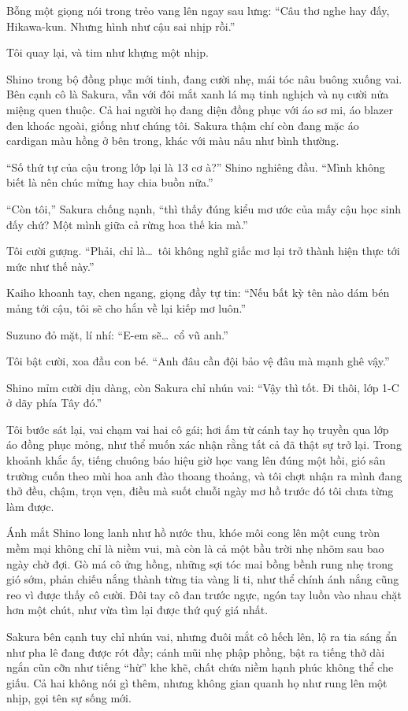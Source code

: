 \documentclass[../main.tex]{subfiles}
\begin{document}
Bỗng một giọng nói trong trẻo vang lên ngay sau lưng: ``Câu thơ nghe hay đấy, Hikawa-kun. Nhưng hình như cậu sai nhịp rồi.''

Tôi quay lại, và tim như khựng một nhịp.

Shino trong bộ đồng phục mới tinh, đang cười nhẹ, mái tóc nâu buông xuống vai. Bên cạnh cô là Sakura, vẫn với đôi mắt xanh lá mạ tinh nghịch và nụ cười nửa miệng quen thuộc. Cả hai người họ đang diện đồng phục với áo sơ mi, áo blazer đen khoác ngoài, giống như chúng tôi. Sakura thậm chí còn đang mặc áo cardigan màu hồng ở bên trong, khác với màu nâu như bình thường.

``Số thứ tự của cậu trong lớp lại là 13 cơ à?'' Shino nghiêng đầu. ``Mình không biết là nên chúc mừng hay chia buồn nữa.''

``Còn tôi,'' Sakura chống nạnh, ``thì thấy đúng kiểu mơ ước của mấy cậu học sinh đấy chứ? Một mình giữa cả rừng hoa thế kia mà.''

Tôi cười gượng. ``Phải, chỉ là\dots\ tôi không nghĩ giấc mơ lại trở thành hiện thực tới mức như thế này.''

Kaiho khoanh tay, chen ngang, giọng đầy tự tin: ``Nếu bất kỳ tên nào dám bén mảng tới cậu, tôi sẽ cho hắn về lại kiếp mơ luôn.''

Suzuno đỏ mặt, lí nhí: ``E-em sẽ\dots\ cổ vũ anh.''

Tôi bật cười, xoa đầu con bé. ``Anh đâu cần đội bảo vệ đâu mà mạnh ghê vậy.''

Shino mỉm cười dịu dàng, còn Sakura chỉ nhún vai: ``Vậy thì tốt. Đi thôi, lớp 1-C ở dãy phía Tây đó.''

Tôi bước sát lại, vai chạm vai hai cô gái; hơi ấm từ cánh tay họ truyền qua lớp áo đồng phục mỏng, như thể muốn xác nhận rằng tất cả đã thật sự trở lại. Trong khoảnh khắc ấy, tiếng chuông báo hiệu giờ học vang lên đúng một hồi, gió sân trường cuốn theo mùi hoa anh đào thoang thoảng, và tôi chợt nhận ra mình đang thở đều, chậm, trọn vẹn, điều mà suốt chuỗi ngày mơ hồ trước đó tôi chưa từng làm được.

Ánh mắt Shino long lanh như hồ nước thu, khóe môi cong lên một cung tròn mềm mại không chỉ là niềm vui, mà còn là cả một bầu trời nhẹ nhõm sau bao ngày chờ đợi. Gò má cô ửng hồng, những sợi tóc mai bồng bềnh rung nhẹ trong gió sớm, phản chiếu nắng thành từng tia vàng li ti, như thể chính ánh nắng cũng reo vì được thấy cô cười. Đôi tay cô đan trước ngực, ngón tay luồn vào nhau chặt hơn một chút, như vừa tìm lại được thứ quý giá nhất.

Sakura bên cạnh tuy chỉ nhún vai, nhưng đuôi mắt cô hếch lên, lộ ra tia sáng ẩn như pha lê đang được rót đầy; cánh mũi nhẹ phập phồng, bật ra tiếng thở dài ngắn cũn cỡn như tiếng ``hừ'' khe khẽ, chất chứa niềm hạnh phúc không thể che giấu. Cả hai không nói gì thêm, nhưng không gian quanh họ như rung lên một nhịp, gọi tên sự sống mới.
\end{document}
